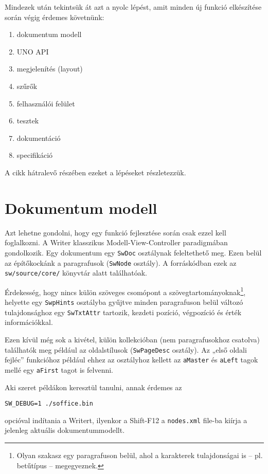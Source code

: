 \documentclass[a4paper]{report}
\begin{document}
Mindezek után tekintsük át azt a nyolc lépést, amit minden új funkció
elkészítése során végig érdemes követnünk:

\begin{enumerate}
\item dokumentum modell
\item UNO API
\item megjelenítés (layout)
\item szűrők
\item felhasználói felület
\item tesztek
\item dokumentáció
\item specifikáció
\end{enumerate}

A cikk hátralevő részében ezeket a lépéseket részletezzük.

\section{Dokumentum modell}

Azt lehetne gondolni, hogy egy funkció fejlesztése során csak ezzel kell
foglalkozni. A Writer klasszikus Modell-View-Controller paradigmában
gondolkozik. Egy dokumentum egy \texttt{SwDoc} osztálynak feleltethető meg. Ezen
belül az építőkockánk a paragrafusok (\texttt{SwNode} osztály). A forráskódban
ezek az \texttt{sw/source/core/} könyvtár alatt találhatóak.

Érdekesség, hogy nincs külön szöveges csomópont a
szövegtartományoknak\footnote{Olyan szakasz egy paragrafuson belül, ahol a
karakterek tulajdonságai is -- pl. betűtípus -- megegyeznek.}, helyette egy
\texttt{SwpHints} osztályba gyűjtve minden paragrafuson belül változó
tulajdonsághoz egy \texttt{SwTxtAttr} tartozik, kezdeti pozíció, végpozíció és
érték információkkal.

Ezen kívül még sok a kivétel, külön kollekcióban (nem paragrafusokhoz csatolva)
találhatók meg például az oldalstílusok (\texttt{SwPageDesc} osztály). Az „első
oldali fejléc” funkcióhoz például ehhez az osztályhoz kellett az
\texttt{aMaster} és \texttt{aLeft} tagok mellé egy \texttt{aFirst} tagot is
felvenni.

Aki szeret példákon keresztül tanulni, annak érdemes az

\begin{verbatim}
SW_DEBUG=1 ./soffice.bin
\end{verbatim}

opcióval indítania a Writert, ilyenkor a Shift-F12 a \texttt{nodes.xml} file-ba
kiírja a jelenleg aktuális dokumentummodellt.
\end{document}

